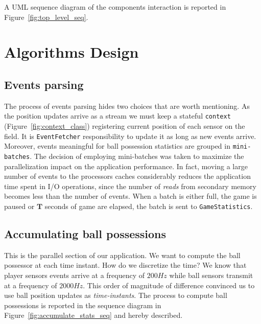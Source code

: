 \documentclass[a4paper, 11pt]{article}
\begin{document}
\begin{multicols}{2}
A UML sequence diagram of the components interaction is reported in Figure~\ref{fig:top_level_seq}.

\section{Algorithms Design}
\subsection{Events parsing}
The process of events parsing hides two choices that are worth mentioning. As the position updates arrive as a stream we must keep a stateful \texttt{context} (Figure~\ref{fig:context_class}) registering current position of each sensor on the field. It is \texttt{EventFetcher} responsibility to update it as long as new events arrive. Moreover, events meaningful for ball possession statistics are grouped in \texttt{mini-batches}. The decision of employing mini-batches was taken to maximize the parallelization impact on the application performance. In fact, moving a large number of events to the processors caches considerably reduces the application time spent in I/O operations, since the number of \textit{reads} from secondary memory becomes less than the number of events. When a batch is either full, the game is paused or $\mathbf{T}$ seconds of game are elapsed, the batch is sent to \texttt{GameStatistics}.

\subsection{Accumulating ball possessions}
\label{sec:accumul}
This is the parallel section of our application. We want to compute the ball possessor at each time instant. How do we discretize the time? We know that player sensors events arrive at a frequency of $200Hz$ while ball sensors transmit at a frequency of $2000Hz$. This order of magnitude of difference convinced us to use ball position updates as \textit{time-instants}. The process to compute ball possessions is reported in the sequence diagram in Figure~\ref{fig:accumulate_stats_seq} and hereby described.


\end{multicols}
\end{document}
